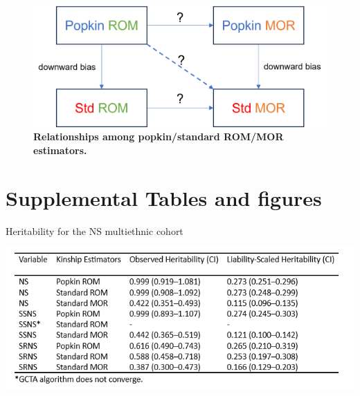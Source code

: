 \documentclass[11pt]{article}
\newcommand{\beginsupplement}{%
  \setcounter{table}{0}
  \renewcommand{\thetable}{S\arabic{table}}%
  \setcounter{figure}{0}
  \renewcommand{\thefigure}{S\arabic{figure}}%
  \setcounter{section}{0}
  \renewcommand{\thesection}{S\arabic{section}}%
  \setcounter{equation}{0}
  \renewcommand{\theequation}{S\arabic{equation}}%
  \setcounter{page}{1}
  \renewcommand{\thepage}{S\arabic{page}}%
}
\begin{document}
\begin{figure}[bp!]
  \centering
  \includegraphics[width=\textwidth]{data/est_relationships.png}
  \caption{
    {\bf Relationships among popkin/standard ROM/MOR estimators.}
    }
  \label{fig:est_relationship}
\end{figure}


\newpage

\printbibliography

\newpage

\beginsupplement

\section{Supplemental Tables and figures}



\begin{table}[h]
  \caption{Heritability for the NS multiethnic cohort}
  \label{tbl:NS_herit_table}
  \includegraphics[width=\linewidth]{data/S_table_1_NS_herit.PNG}
\end{table}
\end{document}
